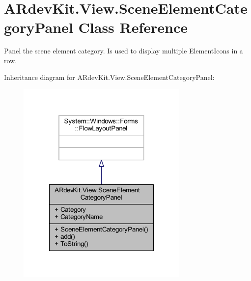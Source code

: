 \hypertarget{class_a_rdev_kit_1_1_view_1_1_scene_element_category_panel}{\section{A\-Rdev\-Kit.\-View.\-Scene\-Element\-Category\-Panel Class Reference}
\label{class_a_rdev_kit_1_1_view_1_1_scene_element_category_panel}
}


Panel the scene element category. Is used to display multiple Element\-Icons in a row.  




Inheritance diagram for A\-Rdev\-Kit.\-View.\-Scene\-Element\-Category\-Panel\-:
\nopagebreak
\begin{figure}[H]
\begin{center}
\leavevmode
\includegraphics[width=238pt]{class_a_rdev_kit_1_1_view_1_1_scene_element_category_panel__inherit__graph}
\end{center}
\end{figure}


